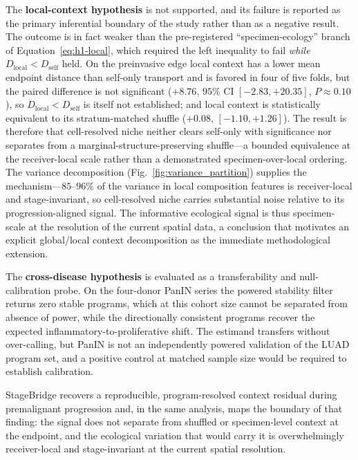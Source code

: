 The \textbf{local-context hypothesis} is not supported, and its failure is reported as the primary
inferential boundary of the study rather than as a negative result. The outcome is in fact weaker than
the pre-registered ``specimen-ecology'' branch of Equation~\ref{eq:h1-local}, which required the left
inequality to fail \emph{while} $D_{\mathrm{local}} < D_{\mathrm{self}}$ held. On the preinvasive edge
local context has a lower mean endpoint distance than self-only transport and is favored in four of
five folds, but the paired difference is not significant ($+8.76$, $95\%$ CI $[-2.83, +20.35]$,
$P \approx 0.10$), so $D_{\mathrm{local}} < D_{\mathrm{self}}$ is itself not established; and local
context is statistically equivalent to its stratum-matched shuffle ($+0.08$, $[-1.10, +1.26]$). The
result is therefore that cell-resolved niche neither clears self-only with significance nor separates
from a marginal-structure-preserving shuffle---a bounded equivalence at the receiver-local scale rather
than a demonstrated specimen-over-local ordering. The variance decomposition
(Fig.~\ref{fig:variance_partition}) supplies the mechanism---$85$--$96\%$ of the variance in local
composition features is receiver-local and stage-invariant, so cell-resolved niche carries substantial
noise relative to its progression-aligned signal. The informative ecological signal is thus
specimen-scale at the resolution of the current spatial data, a conclusion that motivates an explicit
global/local context decomposition as the immediate methodological extension.

The \textbf{cross-disease hypothesis} is evaluated as a transferability and null-calibration probe. On
the four-donor PanIN series the powered stability filter returns zero stable programs, which at this cohort size cannot be
separated from absence of power, while the directionally consistent programs recover the expected
inflammatory-to-proliferative shift. The estimand transfers without over-calling, but PanIN is
not an independently powered validation of the LUAD program set, and a positive control at matched
sample size would be required to establish calibration.

StageBridge recovers a reproducible, program-resolved context residual during premalignant progression
and, in the same analysis, maps the boundary of that finding: the signal does not separate from
shuffled or specimen-level context at the endpoint, and the ecological variation that would carry it is
overwhelmingly receiver-local and stage-invariant at the current spatial resolution.